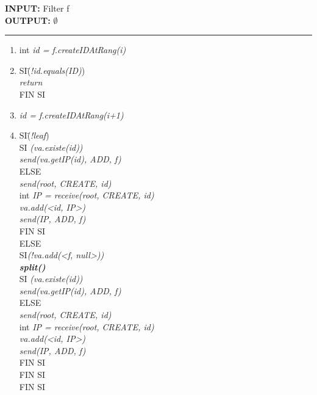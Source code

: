 \documentclass[a4paper,11pt]{report}
\begin{document}
\begin{flushleft}
	\begin{framed}
		\textbf{INPUT:} Filter f\\
		\textbf{OUTPUT:} $\emptyset$
		\noindent\rule{\linewidth}{0.5pt}

		\begin{enumerate}
			\item int \textit{id = f.createIDAtRang(i)}
			\item
			\begin{tabbing}
				SI\= (\textit{!id.equals(ID)})\\
					\> \textit{return}\\
				FIN SI
			\end{tabbing}
			\item \textit{id = f.createIDAtRang(i+1)}
			\item
			\begin{tabbing}
				SI\= (\textit{!leaf})\\
					\> SI \= \textit{(va.existe(id))} \\
					\> \> \textit{send(va.getIP(id), ADD, f)}\\
					\> ELSE\\
					\> \> \textit{send(root, CREATE, id)} \\
					\> \> int \textit{IP = receive(root, CREATE, id)}\\
					\> \> \textit{va.add(<id, IP>)}\\
					\> \> \textit{send(IP, ADD, f)}\\
					\> FIN SI\\
				ELSE\\
					\> SI\= \textit{(!va.add(<f, null>))}\\
					\> \> \textit{\textbf{split()}}\\
					\> \> SI \= \textit{(va.existe(id))} \\
					\> \> \> \textit{send(va.getIP(id), ADD, f)}\\
					\> \> ELSE\\
					\> \> \> \textit{send(root, CREATE, id)} \\
					\> \> \> int \textit{IP = receive(root, CREATE, id)}\\
					\> \> \> \textit{va.add(<id, IP>)}\\
					\> \> \> \textit{send(IP, ADD, f)}\\
					\> \> FIN SI\\
					\> FIN SI\\
				FIN SI
			\end{tabbing}
		\end{enumerate}
	\end{framed}
\end{flushleft}
\end{document}
